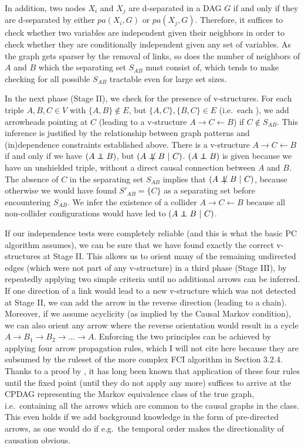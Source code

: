 In addition, two nodes $X_i$ and $X_j$ are d-separated in a DAG $G$ if and only if they are d-separated by either $pa(X_i,G)$ or $pa(X_j,G)$. Therefore, it suffices to check whether two variables are independent given their neighbors in order to check whether they are conditionally independent given any set of variables. As the graph gets sparser by the removal of links, so does the number of neighbors of $A$ and $B$ which the separating set $S_{AB}$ must consist of, which tends to make checking for all possible $S_{AB}$ tractable even for large set sizes.

In the next phase (Stage II), we check for the presence of v-structures. For each triple $A,B,C \in V$ with $\{A,B\} \notin E$, but $\{A,C\},\{B,C\} \in E$ (i.e.\ each \textit{}), we add arrowheads pointing at $C$ (leading to a v-structure $A \rightarrow C \leftarrow B$) if $C \notin S_{AB}$. This inference is justified by the relationship between graph patterns and (in)dependence constraints established above. There is a v-structure $A \rightarrow C \leftarrow B$ if and only if we have $(A \independent B)$, but $(A \notindep B\ |\ C)$.  $(A \independent B)$ is given because we have an unshielded triple, without a direct causal connection between $A$ and $B$. The absence of $C$ in the separating set $S_{AB}$ implies that $(A \notindep B\ |\ C)$, because otherwise we would have found $S'_{AB} = \{C\}$ as a separating set before encountering $S_{AB}$. We infer the existence of a collider $A \rightarrow C \leftarrow B$ because all non-collider configurations would have led to $(A \independent B\ |\ C)$.

If our independence tests were completely reliable (and this is what the basic PC algorithm assumes), we can be sure that we have found exactly the correct v-structures at Stage II. This allows us to orient many of the remaining undirected edges (which were not part of any v-structure) in a third phase (Stage III), by repeatedly applying two simple criteria until no additional arrows can be inferred. If one direction of a link would lead to a new v-structure which was not detected at Stage II, we can add the arrow in the reverse direction (leading to a chain). Moreover, if we assume acyclicity (as implied by the Causal Markov condition), we can also orient any arrow where the reverse orientation would result in a cycle $A \rightarrow B_1 \rightarrow B_2 \rightarrow \dots \rightarrow A$. Enforcing the two principles can be achieved by applying four arrow propagation rules, which I will not cite here because they are subsumed by the ruleset of the more complex FCI algorithm in Section 3.2.4. Thanks to a proof by \cite{meek1995}, it has long been known that application of these four rules until the fixed point (until they do not apply any more) suffices to arrive at the CPDAG representing the Markov equivalence class of the true graph, i.e.\ containing all the arrows which are common to the causal graphs in the class. This even holds if we add background knowledge in the form of pre-directed arrows, as one would do if e.g.\ the temporal order makes the directionality of causation obvious.

